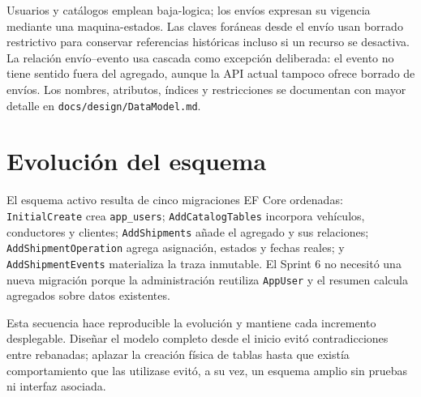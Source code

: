 Usuarios y catálogos emplean \gls{baja-logica}; los envíos expresan su vigencia mediante una \gls{maquina-estados}. Las claves foráneas desde el envío usan borrado restrictivo para conservar referencias históricas incluso si un recurso se desactiva. La relación envío--evento usa cascada como excepción deliberada: el evento no tiene sentido fuera del agregado, aunque la API actual tampoco ofrece borrado de envíos. Los nombres, atributos, índices y restricciones se documentan con mayor detalle en \texttt{docs/design/DataModel.md}.

\section{Evolución del esquema}

El esquema activo resulta de cinco migraciones EF Core ordenadas: \texttt{InitialCreate} crea \texttt{app\_users}; \texttt{AddCatalogTables} incorpora vehículos, conductores y clientes; \texttt{AddShipments} añade el agregado y sus relaciones; \texttt{AddShipmentOperation} agrega asignación, estados y fechas reales; y \texttt{AddShipmentEvents} materializa la traza inmutable. El Sprint 6 no necesitó una nueva migración porque la administración reutiliza \texttt{AppUser} y el resumen calcula agregados sobre datos existentes.

Esta secuencia hace reproducible la evolución y mantiene cada incremento desplegable. Diseñar el modelo completo desde el inicio evitó contradicciones entre rebanadas; aplazar la creación física de tablas hasta que existía comportamiento que las utilizase evitó, a su vez, un esquema amplio sin pruebas ni interfaz asociada.
